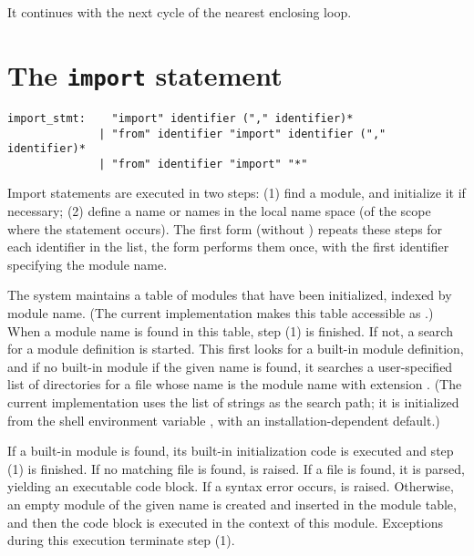 It continues with the next cycle of the nearest enclosing loop.

\section{The {\tt import} statement} \label{import}

\begin{verbatim}
import_stmt:    "import" identifier ("," identifier)*
              | "from" identifier "import" identifier ("," identifier)*
              | "from" identifier "import" "*"
\end{verbatim}

Import statements are executed in two steps: (1) find a module, and
initialize it if necessary; (2) define a name or names in the local
name space (of the scope where the  statement occurs).
The first form (without ) repeats these steps for each
identifier in the list, the  form performs them once, with
the first identifier specifying the module name.

The system maintains a table of modules that have been initialized,
indexed by module name.  (The current implementation makes this table
accessible as .)  When a module name is found in
this table, step (1) is finished.  If not, a search for a module
definition is started.  This first looks for a built-in module
definition, and if no built-in module if the given name is found, it
searches a user-specified list of directories for a file whose name is
the module name with extension .  (The current
implementation uses the list of strings  as the search
path; it is initialized from the shell environment variable
, with an installation-dependent default.)

If a built-in module is found, its built-in initialization code is
executed and step (1) is finished.  If no matching file is found,
 is raised.  If a file is found, it is parsed,
yielding an executable code block.  If a syntax error occurs,
 is raised.  Otherwise, an empty module of the given
name is created and inserted in the module table, and then the code
block is executed in the context of this module.  Exceptions during
this execution terminate step (1).

